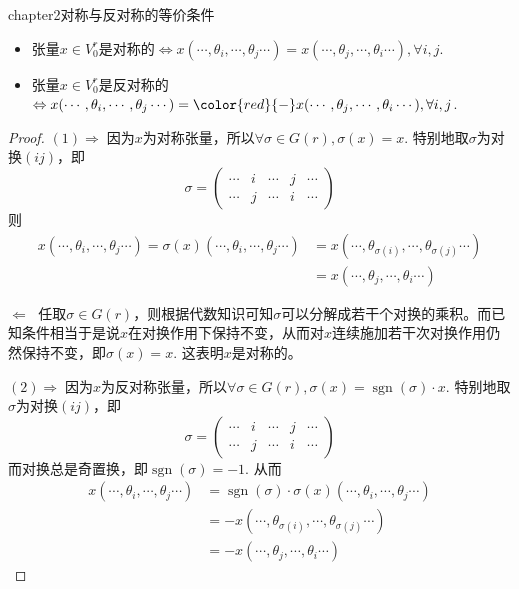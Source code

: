 \begin{myprop}{}{chapter2对称与反对称的等价条件}
	\begin{itemize}
	\item[(1)] 张量$x\in V^{r}_{0}$是对称的$\Leftrightarrow x(\cdots,\theta_{i},\cdots,\theta_{j}\cdots)=x(\cdots,		\theta_{j},\cdots,\theta_{i}\cdots),\forall i,j$.
	\item[(2)] 张量$x\in V^{r}_{0}$是反对称的$\Leftrightarrow x(\cdots,\theta_{i},\cdots,\theta_{j}\cdots)={\color{red}{-}}x(\cdots,\theta_{j},\cdots,\theta_{i}\cdots),\forall i,j$.
	\end{itemize}
\end{myprop}
\begin{proof}
	$(1)\Rightarrow\;$因为$x$为对称张量，所以$\forall \sigma\in G(r),\sigma(x)=x$. 特别地取$\sigma$为对换$(ij)$，即
\[
	\sigma=\left(\begin{array}{lllll}
		\cdots & i &\cdots & j & \cdots  \\
	    \cdots & j &\cdots & i & \cdots 
		\end{array}\right)
\]
则
\[
\begin{split}
	x(\cdots,\theta_{i},\cdots,\theta_{j}\cdots)=\sigma(x)(\cdots,\theta_{i},\cdots,\theta_{j}\cdots)&=x(\cdots,\theta_{\sigma(i)},\cdots,\theta_{\sigma(j)}\cdots)\\
	&=x(\cdots,\theta_{j},\cdots,\theta_{i}\cdots)
\end{split}
\]

$\Leftarrow\;$ 任取$\sigma\in G(r)$，则根据代数知识可知$\sigma$可以分解成若干个对换的乘积。而已知条件相当于是说$x$在对换作用下保持不变，从而对$x$连续施加若干次对换作用仍然保持不变，即$\sigma(x)=x$. 这表明$x$是对称的。

$(2)\Rightarrow\;$因为$x$为反对称张量，所以$\forall \sigma\in G(r),\sigma(x)=\operatorname{sgn}(\sigma) \cdot x$. 特别地取$\sigma$为对换$(ij)$，即
\[
	\sigma=\left(\begin{array}{lllll}
		\cdots & i &\cdots & j & \cdots  \\
	    \cdots & j &\cdots & i & \cdots 
		\end{array}\right)
\]
而对换总是奇置换，即$\operatorname{sgn}(\sigma)=-1$. 从而
\[
\begin{split}
x(\cdots,\theta_{i},\cdots,\theta_{j}\cdots)&=\operatorname{sgn}(\sigma)\cdot \sigma(x)(\cdots,\theta_{i},\cdots,\theta_{j}\cdots)\\
&=-x(\cdots,\theta_{\sigma(i)},\cdots,\theta_{\sigma(j)}\cdots)\\
&=-x(\cdots,\theta_{j},\cdots,\theta_{i}\cdots)
\end{split}
\]


\end{proof}
